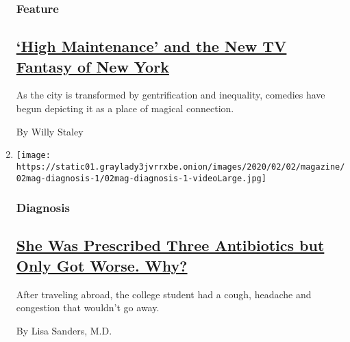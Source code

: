\begin{enumerate}
  \hypertarget{feature-2}{%
  \subsubsection{Feature}\label{feature-2}}

  \hypertarget{high-maintenance-and-the-new-tv-fantasy-of-new-york}{%
  \subsection{\texorpdfstring{\href{/2020/01/30/magazine/new-york-tv.html}{`High
  Maintenance' and the New TV Fantasy of New
  York}}{`High Maintenance' and the New TV Fantasy of New York}}\label{high-maintenance-and-the-new-tv-fantasy-of-new-york}}

  As the city is transformed by gentrification and inequality, comedies
  have begun depicting it as a place of magical connection.

  By Willy Staley
\item
  \texttt{[image: https://static01.graylady3jvrrxbe.onion/images/2020/02/02/magazine/02mag-diagnosis-1/02mag-diagnosis-1-videoLarge.jpg]}

  \hypertarget{diagnosis}{%
  \subsubsection{Diagnosis}\label{diagnosis}}

  \hypertarget{she-was-prescribed-three-antibiotics-but-only-got-worse-why}{%
  \subsection{\texorpdfstring{\href{/2020/01/29/magazine/she-was-prescribed-three-antibiotics-but-only-got-worse-why.html}{She
  Was Prescribed Three Antibiotics but Only Got Worse.
  Why?}}{She Was Prescribed Three Antibiotics but Only Got Worse. Why?}}\label{she-was-prescribed-three-antibiotics-but-only-got-worse-why}}

  After traveling abroad, the college student had a cough, headache and
  congestion that wouldn't go away.

  By Lisa Sanders, M.D.
\end{enumerate}

